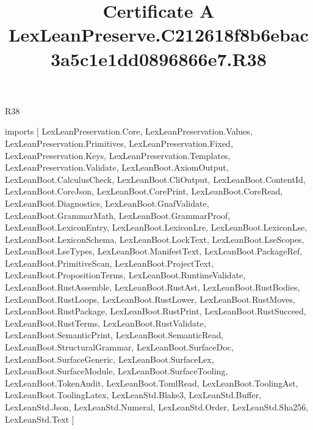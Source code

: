 \begin{lexlean}{R38}
\title{Certificate A LexLeanPreserve.C212618f8b6ebac3a5c1e1dd0896866e7.R38}
\begin{coremodule}
imports [
  LexLeanPreservation.Core,
  LexLeanPreservation.Values,
  LexLeanPreservation.Primitives,
  LexLeanPreservation.Fixed,
  LexLeanPreservation.Keys,
  LexLeanPreservation.Templates,
  LexLeanPreservation.Validate,
  LexLeanBoot.AxiomOutput,
  LexLeanBoot.CalculusCheck,
  LexLeanBoot.CliOutput,
  LexLeanBoot.ContentId,
  LexLeanBoot.CoreJson,
  LexLeanBoot.CorePrint,
  LexLeanBoot.CoreRead,
  LexLeanBoot.Diagnostics,
  LexLeanBoot.GnafValidate,
  LexLeanBoot.GrammarMath,
  LexLeanBoot.GrammarProof,
  LexLeanBoot.LexiconEntry,
  LexLeanBoot.LexiconLre,
  LexLeanBoot.LexiconLse,
  LexLeanBoot.LexiconSchema,
  LexLeanBoot.LockText,
  LexLeanBoot.LseScopes,
  LexLeanBoot.LseTypes,
  LexLeanBoot.ManifestText,
  LexLeanBoot.PackageRef,
  LexLeanBoot.PrimitiveScan,
  LexLeanBoot.ProjectText,
  LexLeanBoot.PropositionTerms,
  LexLeanBoot.RuntimeValidate,
  LexLeanBoot.RustAssemble,
  LexLeanBoot.RustAst,
  LexLeanBoot.RustBodies,
  LexLeanBoot.RustLoops,
  LexLeanBoot.RustLower,
  LexLeanBoot.RustMoves,
  LexLeanBoot.RustPackage,
  LexLeanBoot.RustPrint,
  LexLeanBoot.RustSucceed,
  LexLeanBoot.RustTerms,
  LexLeanBoot.RustValidate,
  LexLeanBoot.SemanticPrint,
  LexLeanBoot.SemanticRead,
  LexLeanBoot.StructuralGrammar,
  LexLeanBoot.SurfaceDoc,
  LexLeanBoot.SurfaceGeneric,
  LexLeanBoot.SurfaceLex,
  LexLeanBoot.SurfaceModule,
  LexLeanBoot.SurfaceTooling,
  LexLeanBoot.TokenAudit,
  LexLeanBoot.TomlRead,
  LexLeanBoot.ToolingAst,
  LexLeanBoot.ToolingLatex,
  LexLeanStd.Blake3,
  LexLeanStd.Buffer,
  LexLeanStd.Json,
  LexLeanStd.Numeral,
  LexLeanStd.Order,
  LexLeanStd.Sha256,
  LexLeanStd.Text
]


\end{coremodule}
\end{lexlean}
